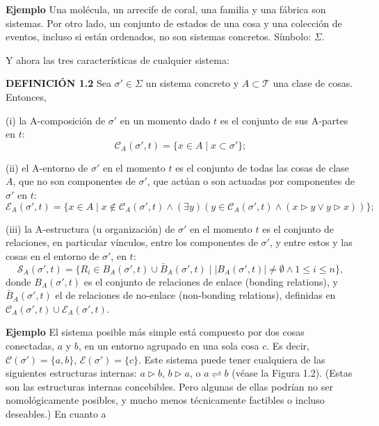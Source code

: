 {\fontsize{13}{15}\selectfont
\textbf{Ejemplo} Una molécula, un arrecife de coral, una familia y una fábrica son sistemas. Por otro lado, un conjunto de estados de una cosa y una colección de eventos, incluso si están ordenados, no son sistemas concretos. Símbolo: $\Sigma$.

Y ahora las tres características de cualquier sistema:

\textbf{DEFINICIÓN 1.2} Sea $\sigma' \in \Sigma$ un sistema concreto y $A \subset \mathcal{T}$ una clase de cosas. Entonces,

(i) la A-composición de $\sigma'$ en un momento dado $t$ es el conjunto de sus A-partes en $t$:
$$ \mathcal{C}_A(\sigma', t) = \{x \in A \mid x \subset \sigma'\}; $$

(ii) el A-entorno de $\sigma'$ en el momento $t$ es el conjunto de todas las cosas de clase $A$, que no son componentes de $\sigma'$, que actúan o son actuadas por componentes de $\sigma'$ en $t$:
$$ \mathcal{E}_A(\sigma', t) = \{x \in A \mid x \notin \mathcal{C}_A(\sigma', t) \land (\exists y)(y \in \mathcal{C}_A(\sigma', t) \land (x \triangleright y \lor y \triangleright x))\}; $$

(iii) la A-estructura (u organización) de $\sigma'$ en el momento $t$ es el conjunto de relaciones, en particular vínculos, entre los componentes de $\sigma'$, y entre estos y las cosas en el entorno de $\sigma'$, en $t$:
$$ \mathcal{S}_A(\sigma', t) = \{R_i \in B_A(\sigma', t) \cup \bar{B}_A(\sigma', t) \mid |B_A(\sigma', t)| \neq \emptyset \land 1 \le i \le n \}, $$
donde $B_A(\sigma', t)$ es el conjunto de relaciones de enlace (bonding relations), y $\bar{B}_A(\sigma', t)$ el de relaciones de no-enlace (non-bonding relations), definidas en $\mathcal{C}_A(\sigma', t) \cup \mathcal{E}_A(\sigma', t)$.

\textbf{Ejemplo} El sistema posible más simple está compuesto por dos cosas conectadas, $a$ y $b$, en un entorno agrupado en una sola cosa $c$. Es decir, $\mathcal{C}(\sigma') = \{a, b\}$, $\mathcal{E}(\sigma') = \{c\}$. Este sistema puede tener cualquiera de las siguientes estructuras internas: $a \triangleright b$, $b \triangleright a$, o $a \rightleftharpoons b$ (véase la Figura 1.2). (Estas son las estructuras internas concebibles. Pero algunas de ellas podrían no ser nomológicamente posibles, y mucho menos técnicamente factibles o incluso deseables.) En cuanto a
}

\newpage


